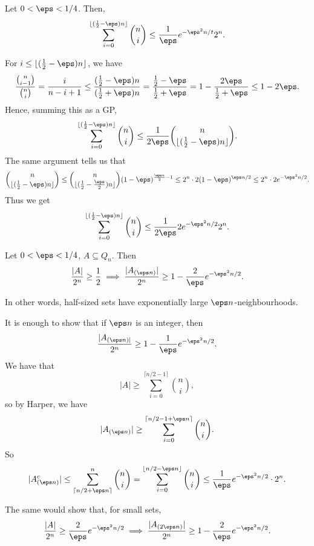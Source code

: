 \documentclass[12pt]{article}
\begin{document}
\begin{proposition}
	Let $0 < \eps < 1/4$. Then,
	\[
	\sum_{i = 0}^{\lfloor (\frac{1}{2} - \eps) n \rfloor} \binom ni \leq \frac{1}{\eps} e^{-\eps^2 n/t} 2^{n}.
	\]
\end{proposition}

\begin{proofbox}
	For $i \leq \lfloor (\frac{1}{2} - \eps) n \rfloor$, we have
	\[
		\frac{\binom n{i-1}}{\binom ni} = \frac{i}{n - i + 1} \leq \frac{(\frac{1}{2} - \eps) n}{(\frac{1}{2} + \eps)n} = \frac{\frac{1}{2} - \eps}{\frac{1}{2} + \eps} = 1 - \frac{2 \eps}{\frac{1}{2} + \eps} \leq 1 - 2 \eps.
	\]
	Hence, summing this as a GP,
	\[
		\sum_{i = 0}^{\lfloor ( \frac{1}{2} - \eps) n \rfloor} \binom ni \leq \frac{1}{2 \eps} \binom n{\lfloor ( \frac{1}{2} - \eps) n \rfloor}.
	\]
	The same argument tells us that
	\[
		\binom{n}{\lfloor (\frac{1}{2} - \eps) n \rfloor} \leq \binom{n}{\lfloor ( \frac{1}{2} - \frac{\eps}{2}) n \rfloor} (1 - \eps)^{\frac{\eps n}{2} - 1} \leq 2^{n} \cdot 2 (1 - \eps)^{\eps n / 2} \leq 2^{n} \cdot 2 e^{-\eps^2 n/2}.
	\]
	Thus we get
	\[
	\sum_{i = 0}^{\lfloor (\frac{1}{2} - \eps) n \rfloor} \binom ni \leq \frac{1}{2 \eps} 2 e^{-\eps^2n / 2} 2^{n}.
	\]
\end{proofbox}


\begin{theorem}
	Let $0 < \eps < 1/4$, $A \subseteq Q_n$. Then
	\[
		\frac{|A|}{2^{n}} \geq \frac{1}{2} \implies \frac{|A_{(\eps n)}|}{2^{n}} \geq 1 - \frac{2}{\eps} e^{-\eps^2n/2}.
	\]
\end{theorem}

In other words, half-sized sets have exponentially large $\eps n$-neighbourhoods.

\begin{proofbox}
	It is enough to show that if $\eps n$ is an integer, then
	\[
	\frac{|A_{(\eps n)|}}{2^{n}} \geq 1 - \frac{1}{\eps} e^{-\eps^2n/2}.
	\]
	We have that
	\[
	|A| \geq \sum_{i = 0}^{\lceil n/2 - 1 \rceil} \binom ni,
	\]
	so by Harper, we have
	\[
	|A_{(\eps n)}| \geq \sum_{i = 0}^{\lceil n/2 - 1 + \eps n\rceil} \binom ni.
	\]
	So
	\[
	|A_{(\eps n)}^{c}| \leq \sum_{\lceil n/2 + \eps n \rceil}^n \binom ni = \sum_{i = 0}^{\lfloor n/2 - \eps n \rfloor} \binom ni \leq \frac{1}{\eps} e^{-\eps^2n/2} \cdot 2^{n}.
	\]
\end{proofbox}

\begin{remark}
	The same would show that, for small sets,
	\[
	\frac{|A|}{2^{n}} \geq \frac{2}{\eps} e^{-\eps^2n/2} \implies \frac{|A_{(2 \eps n)}|}{2^{n}} \geq 1 - \frac{2}{\eps} e^{-\eps^2n/2}.
	\]
\end{remark}
\end{document}
